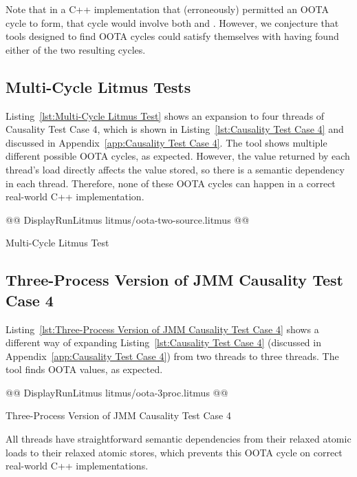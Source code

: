 \documentclass[10]{article}
\begin{document}
Note that in a C++ implementation that (erroneously) permitted an OOTA
cycle to form, that cycle would involve both  and .
However, we conjecture that tools designed to find OOTA cycles could
satisfy themselves with having found either of the two resulting cycles.

\subsection{Multi-Cycle Litmus Tests}
\label{app:Multi-Cycle Litmus Tests}

Listing~\ref{lst:Multi-Cycle Litmus Test}
shows an expansion to four threads of Causality Test Case 4, which is shown in
Listing~\ref{lst:Causality Test Case 4}
and discussed in
Appendix~\ref{app:Causality Test Case 4}.
The  tool shows multiple different possible OOTA cycles,
as expected.
However, the value returned by each thread's load directly affects the
value stored, so there is a semantic dependency in each thread.
Therefore, none of these OOTA cycles can happen in a correct real-world
C++ implementation.

\begin{listing}[tbp]
@@ DisplayRunLitmus litmus/oota-two-source.litmus @@
\caption{Multi-Cycle Litmus Test}
\label{lst:Multi-Cycle Litmus Test}
\end{listing}

\subsection{Three-Process Version of JMM Causality Test Case 4}
\label{app:Three-Process Version of JMM Causality Test Case 4}

Listing~\ref{lst:Three-Process Version of JMM Causality Test Case 4}
shows a different way of expanding
Listing~\ref{lst:Causality Test Case 4}
(discussed in
Appendix~\ref{app:Causality Test Case 4})
from two threads to three threads.
The  tool finds OOTA values, as expected.

\begin{listing}[tbp]
@@ DisplayRunLitmus litmus/oota-3proc.litmus @@
\caption{Three-Process Version of JMM Causality Test Case 4}
\label{lst:Three-Process Version of JMM Causality Test Case 4}
\end{listing}

All threads have straightforward semantic dependencies from their
relaxed atomic loads to their relaxed atomic stores, which prevents this
OOTA cycle on correct real-world C++ implementations.
\end{document}
